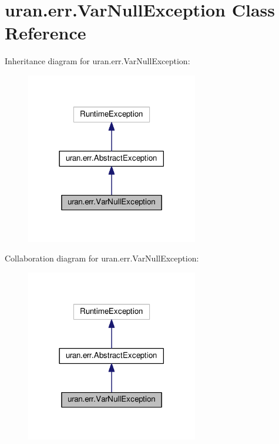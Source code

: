 \hypertarget{classuran_1_1err_1_1_var_null_exception}{}\section{uran.\+err.\+Var\+Null\+Exception Class Reference}
\label{classuran_1_1err_1_1_var_null_exception}


Inheritance diagram for uran.\+err.\+Var\+Null\+Exception\+:
\nopagebreak
\begin{figure}[H]
\begin{center}
\leavevmode
\includegraphics[width=213pt]{classuran_1_1err_1_1_var_null_exception__inherit__graph}
\end{center}
\end{figure}


Collaboration diagram for uran.\+err.\+Var\+Null\+Exception\+:
\nopagebreak
\begin{figure}[H]
\begin{center}
\leavevmode
\includegraphics[width=213pt]{classuran_1_1err_1_1_var_null_exception__coll__graph}
\end{center}
\end{figure}
